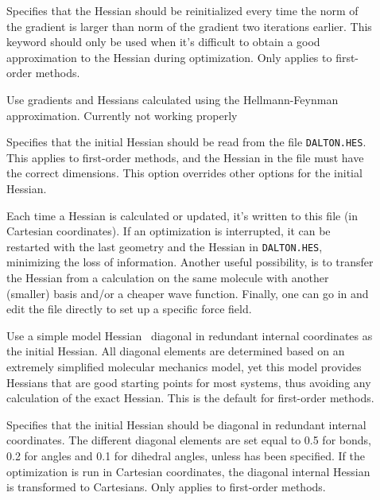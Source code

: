 \begin{description}
\item[]
Specifies that the Hessian should be
reinitialized every time the norm
of the gradient is larger than norm of the gradient two iterations
earlier. This keyword should only be used when it's difficult to
obtain a good approximation to the Hessian during optimization. Only
applies to first-order methods.

\item[]
Use gradients and Hessians calculated using the Hellmann-Feynman
approximation. Currently not working properly

\item[]
Specifies that the initial Hessian
should be
read from the file \verb|DALTON.HES|. This applies to first-order
methods, and the Hessian in the file must have the correct
dimensions. This option overrides other options for the initial
Hessian.

Each time a Hessian is calculated or updated,
it's written to this file (in Cartesian coordinates). If an
optimization is interrupted, it can be restarted with the 
last geometry and the Hessian in \verb|DALTON.HES|, minimizing the
loss of information. Another useful possibility, is to transfer
the Hessian from a calculation on the same molecule with another
(smaller) basis and/or a cheaper wave function. Finally, one can go in
and edit the file directly to set up a specific force field.

\item[]
Use a simple model Hessian~\cite{rlabgkpamcpl241} diagonal in redundant
internal coordinates as the initial Hessian. All diagonal elements are
determined based on an extremely simplified molecular mechanics model,
yet this model provides Hessians that are good starting points for
most systems, thus avoiding any calculation of the exact Hessian. This
is the default for first-order methods.

\item[]
Specifies that the initial Hessian
should be diagonal in redundant internal coordinates. The different diagonal
elements are set equal to 0.5 for bonds, 0.2 for angles and 0.1 for
dihedral angles, unless  has been specified. If the
optimization is run in Cartesian coordinates, the diagonal internal
Hessian is transformed to Cartesians. Only applies to first-order
methods.


\end{description}
